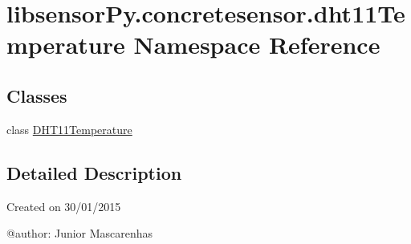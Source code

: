 \hypertarget{namespacelibsensorPy_1_1concretesensor_1_1dht11Temperature}{}\section{libsensor\+Py.\+concretesensor.\+dht11\+Temperature Namespace Reference}
\label{namespacelibsensorPy_1_1concretesensor_1_1dht11Temperature}
\subsection*{Classes}
\begin{DoxyCompactItemize}
\item 
class \hyperlink{classlibsensorPy_1_1concretesensor_1_1dht11Temperature_1_1DHT11Temperature}{D\+H\+T11\+Temperature}
\end{DoxyCompactItemize}


\subsection{Detailed Description}
\begin{DoxyVerb}Created on 30/01/2015

@author: Junior Mascarenhas
\end{DoxyVerb}
 
